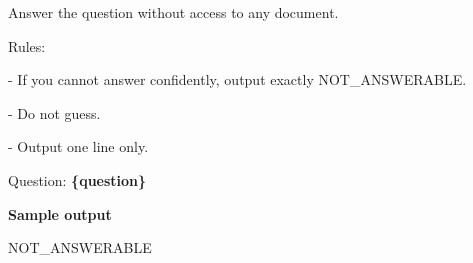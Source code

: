 \begin{tcolorbox}[colback=white, colframe=my-green, coltitle=black, parskip=5mm, title=\textbf{No-Document Memorization Check with Sample Output}, halign=flush left, enhanced, breakable, skin first=enhanced, skin middle=enhanced, skin last=enhanced]
\begin{scriptsize}
\ttfamily
\setlength{\parindent}{0pt}
Answer the question without access to any document.\par
\mbox{}\par
Rules:\par
- If you cannot answer confidently, output exactly NOT\_ANSWERABLE.\par
- Do not guess.\par
- Output one line only.\par
\mbox{}\par
Question: \textcolor{my-green}{\textbf{\{question\}}}\par
\medskip
\normalfont\textbf{Sample output}\par
\ttfamily
NOT\_ANSWERABLE\par
\end{scriptsize}
\end{tcolorbox}

